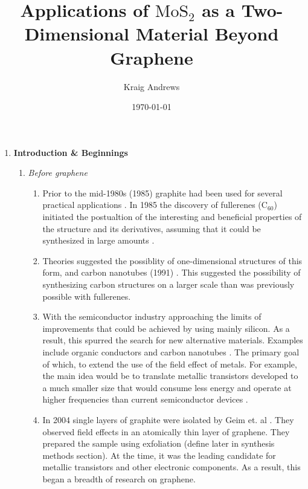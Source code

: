 \documentclass{article}
\author{Kraig Andrews}
\title{Applications of $\mathrm{MoS}_2$ as a Two-Dimensional Material Beyond Graphene}
\date{\today}
\begin{document}
\maketitle

\begin{enumerate}%
	\item{ \textbf{Introduction \& Beginnings}}
	\begin{enumerate} %
		\item{\textit{Before graphene}}
			\begin{enumerate} %

				\item{Prior to the mid-1980s (1985) graphite had been used for several practical applications \cite{ nanoscaleReview2011}. In 1985 the discovery of fullerenes ($\mathrm{C}_{60}$) initiated the postualtion of the interesting and beneficial properties of the structure and its derivatives, assuming that it could be synthesized in large amounts \cite{krotoFullerenes1985}. }

				\item{Theories suggested the possiblity of one-dimensional structures of this form, and carbon nanotubes (1991) \cite{iijimaCarbonNanotubes1991}. This suggested the possibility of synthesizing carbon structures on a larger scale than was previously possible with fullerenes.}

				\item{With the semiconductor industry approaching the limits of improvements that could be achieved by using mainly silicon. As a result, this spurred the search for new alternative materials. Examples include organic conductors \cite{novoselovEtAl2004, mascaro2001} and carbon nanotubes \cite{Baughman2002}. The primary goal of which, to extend the use of the field effect of metals. For example, the main idea would be to translate metallic transistors developed to a much smaller size that would consume less energy and operate at higher frequencies than current semiconductor devices \cite{novoselovEtAl2004,Rotkin2004}.}

				\item{In 2004 single layers of graphite were isolated by Geim et. al \cite{novoselovEtAl2004, novoselovEtAl2005}. They observed field effects in an atomically thin layer of graphene. They prepared the sample using exfoliation (define later in synthesis methods section). At the time, it was the leading candidate for metallic transistors and other electronic components. As a result, this began a breadth of research on graphene.}


\end{enumerate}
\end{enumerate}
\end{enumerate}
\end{document}
